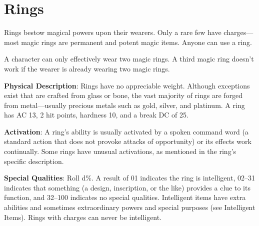 \section{Rings}

\label{f0}				
Rings bestow magical powers upon their wearers. Only a rare few have charges---most magic rings are permanent and potent magic items. Anyone can use a ring.
				
A character can only effectively wear two magic rings. A third magic ring doesn't work if the wearer is already wearing two magic rings.
				
\textbf{Physical Description}: Rings have no appreciable weight. Although exceptions exist that are crafted from glass or bone, the vast majority of rings are forged from metal---usually precious metals such as gold, silver, and platinum. A ring has AC 13, 2 hit points, hardness 10, and a break DC of 25.
				
\textbf{Activation}: A ring's ability is usually activated by a spoken command word (a standard action that does not provoke attacks of opportunity) or its effects work continually. Some rings have unusual activations, as mentioned in the ring's specific description.
				
\textbf{Special Qualities}: Roll d\%. A result of 01 indicates the ring is intelligent, 02--31 indicates that something (a design, inscription, or the like) provides a clue to its function, and 32--100 indicates no special qualities. Intelligent items have extra abilities and sometimes extraordinary powers and special purposes (see Intelligent Items). Rings with charges can never be intelligent.

